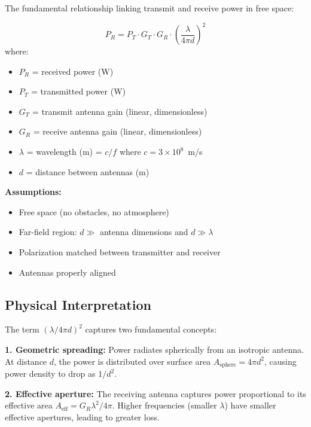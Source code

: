 The fundamental relationship linking transmit and receive power in free space:

\begin{equation}
P_R = P_T \cdot G_T \cdot G_R \cdot \left(\frac{\lambda}{4\pi d}\right)^2
\end{equation}
where:
\begin{itemize}
\item $P_R$ = received power (W)
\item $P_T$ = transmitted power (W)
\item $G_T$ = transmit antenna gain (linear, dimensionless)
\item $G_R$ = receive antenna gain (linear, dimensionless)
\item $\lambda$ = wavelength (m) = $c/f$ where $c = 3 \times 10^8$~m/s
\item $d$ = distance between antennas (m)
\end{itemize}

\textbf{Assumptions:}
\begin{itemize}
\item Free space (no obstacles, no atmosphere)
\item Far-field region: $d \gg$ antenna dimensions and $d \gg \lambda$
\item Polarization matched between transmitter and receiver
\item Antennas properly aligned
\end{itemize}

\subsection{Physical Interpretation}

The term $(\lambda/4\pi d)^2$ captures two fundamental concepts:

\textbf{1. Geometric spreading:} Power radiates spherically from an isotropic antenna. At distance $d$, the power is distributed over surface area $A_{\text{sphere}} = 4\pi d^2$, causing power density to drop as $1/d^2$.

\textbf{2. Effective aperture:} The receiving antenna captures power proportional to its effective area $A_{\text{eff}} = G_R \lambda^2 / 4\pi$. Higher frequencies (smaller $\lambda$) have smaller effective apertures, leading to greater loss.

